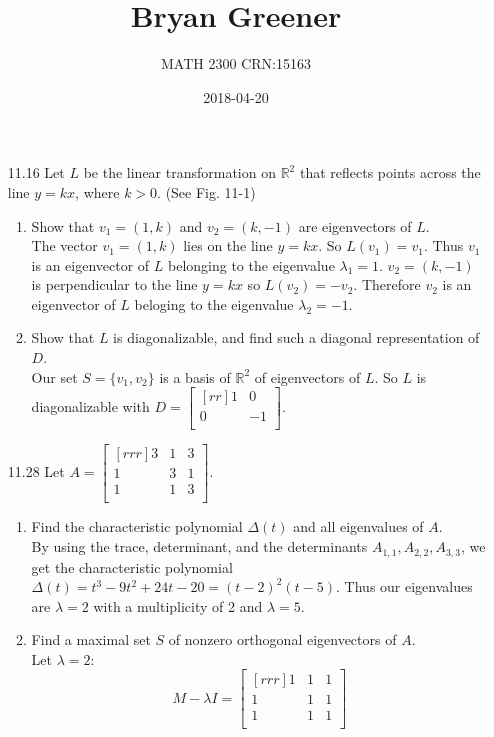 \documentclass[12pt]{article}
\title{Bryan Greener}
\author{MATH 2300 CRN:15163}
\date{2018-04-20}
\theoremstyle{definition}
\theoremstyle{plain}
\begin{document}
\maketitle

\TabPositions{4cm}
\begin{enumerate}
\item[11.16]Let $L$ be the linear transformation on $\mathbb{R}^2$ that reflects points across the line $y=kx$, where $k>0$. (See Fig. 11-1)
	\begin{enumerate}
	\item Show that $v_1=(1,k)$ and $v_2=(k,-1)$ are eigenvectors of $L$.\\
		The vector $v_1=(1,k)$ lies on the line $y=kx$. So $L(v_1)=v_1$. Thus $v_1$ is an eigenvector of $L$ belonging to the eigenvalue $\lambda_1=1$. $v_2=(k,-1)$ is perpendicular to the line $y=kx$ so $L(v_2)=-v_2$. Therefore $v_2$ is an eigenvector of $L$ beloging to the eigenvalue $\lambda_2=-1$.
	\item Show that $L$ is diagonalizable, and find such a diagonal representation of $D$.\\
		Our set $S=\{v_1,v_2\}$ is a basis of $\mathbb{R}^2$ of eigenvectors of $L$. So $L$ is diagonalizable with $D=\begin{bmatrix}[rr]1&0\\0&-1\\\end{bmatrix}$.
	\end{enumerate}
\item[11.28]Let $A=\begin{bmatrix}[rrr]3&1&3\\1&3&1\\1&1&3\\\end{bmatrix}$.
	\begin{enumerate}
	\item Find the characteristic polynomial $\Delta(t)$ and all eigenvalues of $A$.\\
		By using the trace, determinant, and the determinants $A_{1,1},A_{2,2},A_{3,3}$, we get the characteristic polynomial $\Delta(t) = t^3-9t^2+24t-20 = (t-2)^2(t-5)$. Thus our eigenvalues are $\lambda=2$ with a multiplicity of 2 and $\lambda=5$. 
	\item Find a maximal set $S$ of nonzero orthogonal eigenvectors of $A$.\\
		Let $\lambda=2$:
		\[ M-\lambda I = \begin{bmatrix}[rrr]1&1&1\\1&1&1\\1&1&1\\\end{bmatrix} \]

\end{enumerate}
\end{enumerate}
\end{document}
